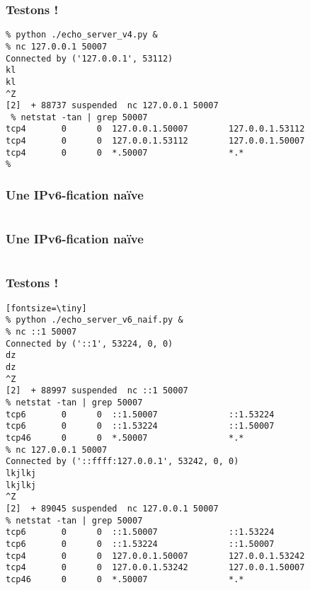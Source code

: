\begin{frame}[fragile]{}
	\frametitle{Testons !}
	
	\begin{verbatim}
% python ./echo_server_v4.py &
% nc 127.0.0.1 50007
Connected by ('127.0.0.1', 53112)
kl
kl
^Z
[2]  + 88737 suspended  nc 127.0.0.1 50007
 % netstat -tan | grep 50007
tcp4       0      0  127.0.0.1.50007        127.0.0.1.53112 
tcp4       0      0  127.0.0.1.53112        127.0.0.1.50007 
tcp4       0      0  *.50007                *.*             
%
	\end{verbatim}

\end{frame}

\begin{frame}[fragile]{}
	\frametitle{Une IPv6-fication naïve}
    \begin{minipage}{0.5\textwidth}
      \inputminted[mathescape,
        fontsize=\scriptsize,
        framesep=2mm]{diff}{../echo_server_v4_v6.diff}
    \end{minipage}
\end{frame}


\begin{frame}[fragile]{}
	\frametitle{Une IPv6-fication naïve}
    \begin{minipage}{0.5\textwidth}
      \inputminted[mathescape,
        linenos,
        fontsize=\scriptsize,
        framesep=2mm]{python}{../echo_server_v6_naif.py}
    \end{minipage}
\end{frame}



\begin{frame}[fragile]{}
	\frametitle{Testons !}
	
	\begin{verbatim}[fontsize=\tiny]
% python ./echo_server_v6_naif.py &
% nc ::1 50007 
Connected by ('::1', 53224, 0, 0)
dz
dz
^Z
[2]  + 88997 suspended  nc ::1 50007
% netstat -tan | grep 50007
tcp6       0      0  ::1.50007              ::1.53224
tcp6       0      0  ::1.53224              ::1.50007
tcp46      0      0  *.50007                *.*             
% nc 127.0.0.1 50007
Connected by ('::ffff:127.0.0.1', 53242, 0, 0)
lkjlkj
lkjlkj
^Z
[2]  + 89045 suspended  nc 127.0.0.1 50007
% netstat -tan | grep 50007
tcp6       0      0  ::1.50007              ::1.53224       
tcp6       0      0  ::1.53224              ::1.50007       
tcp4       0      0  127.0.0.1.50007        127.0.0.1.53242 
tcp4       0      0  127.0.0.1.53242        127.0.0.1.50007 
tcp46      0      0  *.50007                *.*             
	\end{verbatim}

\end{frame}

